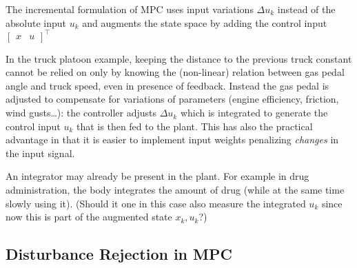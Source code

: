 The incremental formulation of MPC uses input variations $\Delta u_k$ instead of the absolute input $u_k$ and augments the state space by adding the control input $
\begin{bmatrix}
  x & u
\end{bmatrix}^\top
$



In the truck platoon example, keeping the distance to the previous truck constant cannot be relied on only by knowing the (non-linear) relation between gas pedal angle and truck speed, even in presence of feedback. Instead the gas pedal is adjusted to compensate for variations of parameters (engine efficiency, friction, wind gusts\ldots): the controller adjusts $\Delta u_k$ which is integrated to generate the control input $u_k$ that is then fed to the plant. This has also the practical advantage in that it is easier to implement input weights penalizing \emph{changes} in the input signal.

An integrator may already be present in the plant. For example in drug administration, the body integrates the amount of drug (while at the same time slowly using it). (Should it one in this case also measure the integrated $u_k$ since now this is part of the augmented state $x_k,u_k$?)

\subsection{Disturbance Rejection in MPC}
\label{sec:disturbance-rejection}




